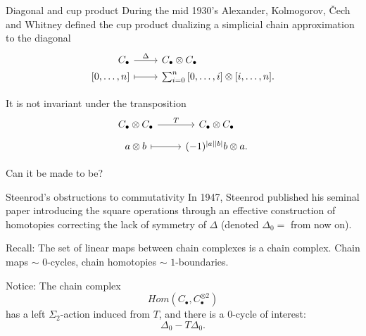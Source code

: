 \documentclass[10pt,t]{beamer}
\begin{document}
\begin{frame}[fragile]{Diagonal and cup product}
	During the mid 1930's Alexander, Kolmogorov, \v{C}ech and Whitney defined the cup product dualizing a simplicial chain approximation to the diagonal
	\begin{equation*}
	\begin{tikzcd}[%
	,row sep = 0ex
	,/tikz/column 1/.append style={anchor=base east}
	,/tikz/column 2/.append style={anchor=base west}
	]
	C_\bullet \arrow[r, "\Delta"] & C_\bullet \otimes C_\bullet \\
	{[0, \dots, n]} \arrow[r, |->] & \sum_{i=0}^{n} {[0, \dots, i] \otimes [i, \dots, n]}.
	\end{tikzcd}
	\end{equation*}

	\pause \vspace*{10pt}

	It is not invariant under the transposition
	\begin{equation*}
	\begin{tikzcd}[row sep = tiny]
	C_\bullet \otimes C_\bullet \arrow[r, "T"] & C_\bullet \otimes C_\bullet \\
	a \otimes b \arrow[r, |->]& (-1)^{|a||b|} b \otimes a.
	\end{tikzcd}
	\end{equation*}
	
	\vspace*{10pt}\pause
	
	\textcolor{pblue}{Can it be made to be?}
	
	


\end{frame}


\begin{frame}{Steenrod's obstructions to commutativity}
	In 1947, Steenrod published his seminal paper introducing the square operations through an effective construction of homotopies correcting the lack of symmetry of $\Delta$ (denoted $\Delta_0 = $ from now on).

	\vspace*{15pt} \pause

	\textcolor{pblue}{Recall:} The set of linear maps between chain complexes is a chain complex.
	Chain maps $\sim$ $0$-cycles, chain homotopies $\sim$ $1$-boundaries.

	\vspace*{15pt}\pause

	\textcolor{pblue}{Notice:} The chain complex
	\begin{equation*} \label{eq: complex of maps to the tensor product}
	Hom\left(C_\bullet, C_\bullet^{\otimes 2}  \right)
	\end{equation*}
	has a left $\Sigma_2$-action induced from $T$, and there is a $0$-cycle of interest:
	\begin{equation*}
	\Delta_0 - T \Delta_0.
	\end{equation*}
\end{frame}
\end{document}
